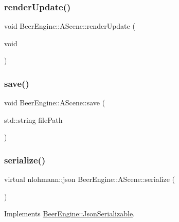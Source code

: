 \subsubsection{\texorpdfstring{render\+Update()}{renderUpdate()}}
{\footnotesize\ttfamily void Beer\+Engine\+::\+A\+Scene\+::render\+Update (\begin{DoxyParamCaption}\item[{void}]{ }\end{DoxyParamCaption})}

\mbox{\label{class_beer_engine_1_1_a_scene_a65e03ade02de4673cd25544d4843c6d8}} 
\subsubsection{\texorpdfstring{save()}{save()}}
{\footnotesize\ttfamily void Beer\+Engine\+::\+A\+Scene\+::save (\begin{DoxyParamCaption}\item[{std\+::string}]{file\+Path }\end{DoxyParamCaption})}

\mbox{\label{class_beer_engine_1_1_a_scene_ae876ec81592c80e7346f05c56bdaa929}} 
\subsubsection{\texorpdfstring{serialize()}{serialize()}}
{\footnotesize\ttfamily virtual nlohmann\+::json Beer\+Engine\+::\+A\+Scene\+::serialize (\begin{DoxyParamCaption}{ }\end{DoxyParamCaption})\hspace{0.3cm}{\ttfamily [virtual]}}



Implements \mbox{\hyperlink{class_beer_engine_1_1_json_serializable_a17689cbd8fe282c570bd026cc1be5b3b}{Beer\+Engine\+::\+Json\+Serializable}}.

\mbox{\label{class_beer_engine_1_1_a_scene_a332808581c9141259a6acdc2fa8e0e5c}} 
